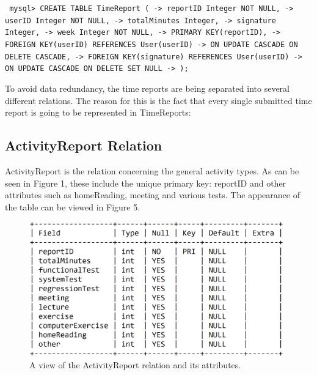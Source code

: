 \documentclass{article}
\begin{document}
\small
\texttt{
\noindent mysql> CREATE TABLE TimeReport (\newline
\indent \indent \indent -> reportID Integer NOT NULL,\newline
\indent \indent \indent -> userID Integer NOT NULL,\newline
\indent \indent \indent -> totalMinutes Integer,\newline
\indent \indent \indent -> signature Integer,\newline
\indent \indent \indent -> week Integer NOT NULL,\newline
\indent \indent \indent -> PRIMARY KEY(reportID),\newline
\indent \indent \indent -> FOREIGN KEY(userID) REFERENCES User(userID)\newline
\indent \indent \indent -> ON UPDATE CASCADE ON DELETE CASCADE,\newline
\indent \indent \indent -> FOREIGN KEY(signature) REFERENCES User(userID)\newline
\indent \indent \indent -> ON UPDATE CASCADE ON DELETE SET NULL\newline
\indent \indent \indent -> );
}
\normalsize
\newline

To avoid data redundancy, the time reports are being separated into several different relations. The reason for this is the fact that every single submitted time report is going to be represented in TimeReports:

\subsection{ActivityReport Relation}
ActivityReport is the relation concerning the general activity types. As can be seen in Figure 1, these include the unique primary key: reportID and other attributes such as homeReading, meeting and various tests. The appearance of the table can be viewed in Figure 5.
\newline

\begin{figure}[H]
     \centering
     \includegraphics[width=11cm]{images/SQL_tables/activityreport.png}
     \renewcommand\figurename{Figure}
     \caption{A view of the ActivityReport relation and its attributes.}
     \label{fig:my_label}
 \end{figure}
\newline
\end{document}
